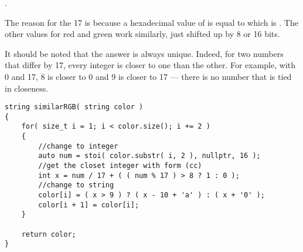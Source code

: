 . 

The reason for the 17 is because a hexadecimal value of  is equal to  which is . The other values for red and green work similarly, just shifted up by 8 or 16 bits.

It should be noted that the answer is always unique. Indeed, for two numbers that differ by 17, every integer is closer to one than the other. For example, with 0 and 17, 8 is closer to 0 and 9 is closer to 17 --- there is no number that is tied in closeness.

\setcounter{lstlisting}{0}
\begin{lstlisting}[style=customc, caption={Brute Force}]
string similarRGB( string color )
{
    for( size_t i = 1; i < color.size(); i += 2 )
    {
        //change to integer
        auto num = stoi( color.substr( i, 2 ), nullptr, 16 );
        //get the closet integer with form (cc)
        int x = num / 17 + ( ( num % 17 ) > 8 ? 1 : 0 );
        //change to string
        color[i] = ( x > 9 ) ? ( x - 10 + 'a' ) : ( x + '0' );
        color[i + 1] = color[i];
    }

    return color;
}
\end{lstlisting}